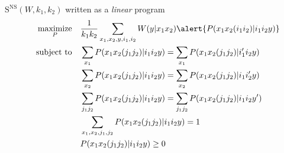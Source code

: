 \documentclass{beamer}
\theoremstyle{definition}
\theoremstyle{remark}
\DeclareMathOperator{\maxi}{\text{maximize}}
\DeclareMathOperator{\st}{\text{subject to}}
\begin{document}
\begin{frame}{$\mathrm{S}^{\mathrm{NS}}(W,k_1,k_2)$ written as a \emph{linear} program}
\begin{equation*}
  \begin{aligned}
    &&\underset{P}{\maxi} &&& \frac{1}{k_1k_2} \sum_{x_1,x_2,y,i_1,i_2} W(y|x_1x_2)\alert{P(x_1x_2(i_1i_2)|i_1i_2y)}\\
    &&\st &&& \sum_{x_1} P(x_1x_2(j_1j_2)|i_1i_2y) = \sum_{x_1} P(x_1x_2(j_1j_2)|i_1'i_2y)\\
    &&&&& \sum_{x_2} P(x_1x_2(j_1j_2)|i_1i_2y) = \sum_{x_2} P(x_1x_2(j_1j_2)|i_1i_2'y)\\
    &&&&& \sum_{j_1j_2} P(x_1x_2(j_1j_2)|i_1i_2y) = \sum_{j_1j_2} P(x_1x_2(j_1j_2)|i_1i_2y')\\
    &&&&& \sum_{x_1,x_2,j_1,j_2} P(x_1x_2(j_1j_2)|i_1i_2y) = 1\\
    &&&&& P(x_1x_2(j_1j_2)|i_1i_2y) \geq 0
  \end{aligned}
\end{equation*}
\end{frame}

\end{document}
